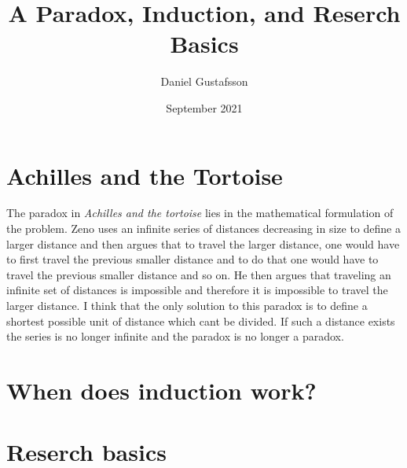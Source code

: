 \documentclass[11pt,a4paper]{article}
\begin{document}
\title{A Paradox, Induction, and Reserch Basics}
\author{Daniel Gustafsson}
\date{September 2021}
\maketitle

\section{Achilles and the Tortoise}
The paradox in \textit{Achilles and the tortoise} lies in the mathematical formulation of the problem.
Zeno uses an infinite series of distances decreasing in size to define a larger distance and then argues that to travel the larger distance,
one would have to first travel the previous smaller distance and to do that one would have to travel the previous smaller distance and so on.
He then argues that traveling an infinite set of distances is impossible and therefore it is impossible to travel the larger distance.
I think that the only solution to this paradox is to define a shortest possible unit of distance which cant be divided. 
If such a distance exists the series is no longer infinite and the paradox is no longer a paradox.


\section{When does induction work?}



\section{Reserch basics}
	
\end{document}
